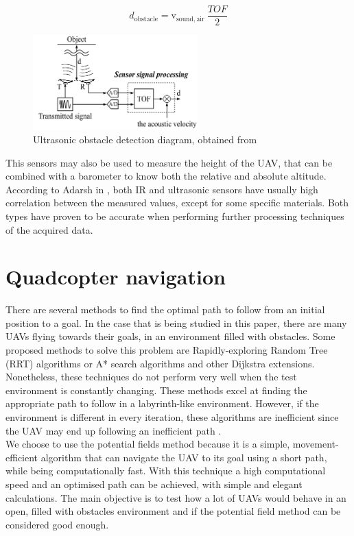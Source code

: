 \documentclass[journal]{IEEEtran}
\newcommand*{\subb}[1]{_{\mathrm{#1}}}
\begin{document}
		\begin{equation} \label{eq:ultrasonic_formula}
		d\subb{obstacle} = \textrm{v}\subb{sound, air} \ \frac{TOF}{2}
		\end{equation}
		\begin{figure}
			\centering
			\includegraphics[width=2.5in]{ultrasonic2}
			\caption{Ultrasonic obstacle detection diagram, obtained from \cite{hirata2008cross}}
			\label{fig:ultrasonic}
		\end{figure}
		
		This sensors may also be used to measure the height of the UAV, that can be combined with a barometer to know both the relative and absolute altitude. According to Adarsh in \cite{AdarshS2016PcoI}, both IR and ultrasonic sensors have usually high correlation between the measured values, except for some specific materials. Both types have proven to be accurate when performing further processing techniques of the acquired data.
		
	\section{Quadcopter navigation}\label{navigation}
		There are several methods to find the optimal path to follow from an initial position to a goal. In the case that is being studied in this paper, there are many UAVs flying towards their goals, in an environment filled with obstacles. Some proposed methods to solve this problem are Rapidly-exploring Random Tree (RRT) algorithms or A* search algorithms and other Dijkstra extensions.	Nonetheless, these techniques do not perform very well when the test environment is constantly changing. These methods excel at finding the appropriate path to follow in a labyrinth-like environment. However, if the environment is different in every iteration, these algorithms are inefficient since the UAV may end up following an inefficient path \cite{lavalle_rrt, lavalle_astar}.\\
 	
		We choose to use the potential fields method because it is a simple, movement-efficient algorithm that can navigate the UAV to its goal using a short path, while being computationally fast. With this technique a high computational speed and an optimised path can be achieved, with simple and elegant calculations\cite{Ge2002}. The main objective is to test how a lot of UAVs would behave in an open, filled with obstacles environment and if the potential field method can be considered good enough.\\
	
\end{document}
